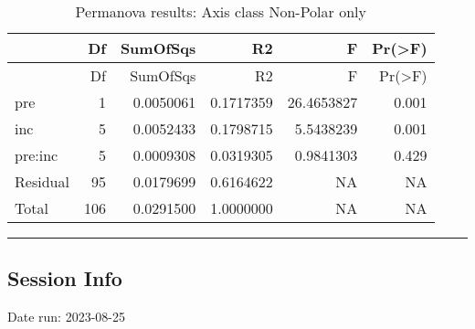 \documentclass[
]{article}
\begin{document}
\begin{longtable}[]{@{}lrrrrr@{}}
\caption{Permanova results: Axis class Non-Polar only}\tabularnewline
\toprule\noalign{}
& Df & SumOfSqs & R2 & F & Pr(\textgreater F) \\
\midrule\noalign{}
\endfirsthead
\toprule\noalign{}
& Df & SumOfSqs & R2 & F & Pr(\textgreater F) \\
\midrule\noalign{}
\endhead
\bottomrule\noalign{}
\endlastfoot
pre & 1 & 0.0050061 & 0.1717359 & 26.4653827 & 0.001 \\
inc & 5 & 0.0052433 & 0.1798715 & 5.5438239 & 0.001 \\
pre:inc & 5 & 0.0009308 & 0.0319305 & 0.9841303 & 0.429 \\
Residual & 95 & 0.0179699 & 0.6164622 & NA & NA \\
Total & 106 & 0.0291500 & 1.0000000 & NA & NA \\
\end{longtable}

\begin{center}\rule{0.5\linewidth}{0.5pt}\end{center}

\hypertarget{session-info}{%
\subsection{Session Info}\label{session-info}}

Date run: 2023-08-25
\end{document}
